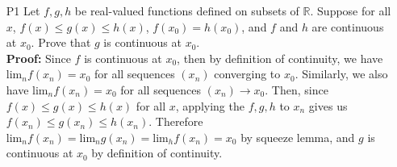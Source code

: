 \documentclass{article}
\begin{document}
\begin{itemize}
    \item [P1] Let $f,g,h$ be real-valued functions defined on subsets of $\mathbb{R}$. Suppose for all $x$, $f(x)\leq g(x)\leq h(x)$, $f(x_0)=h(x_0)$, and $f$ and $h$ are continuous at $x_0$. Prove that $g$ is continuous at $x_0$.\\\textbf{Proof: } Since $f$ is continuous at $x_0$, then by definition of continuity, we have $\text{lim}_nf(x_n)=x_0$ for all sequences $(x_n)$ converging to $x_0$. Similarly, we also have $\text{lim}_nf(x_n)=x_0$ for all sequences $(x_n)\rightarrow x_0$. Then, since $f(x)\leq g(x)\leq h(x)$ for all $x$, applying the $f,g,h$ to $x_n$ gives us $f(x_n)\leq g(x_n)\leq h(x_n)$. Therefore $\text{lim}_nf(x_n)=\text{lim}_ng(x_n)=\text{lim}_hf(x_n)=x_0$ by squeeze lemma, and $g$ is continuous at $x_0$ by definition of continuity.
\end{itemize}
\end{document}
